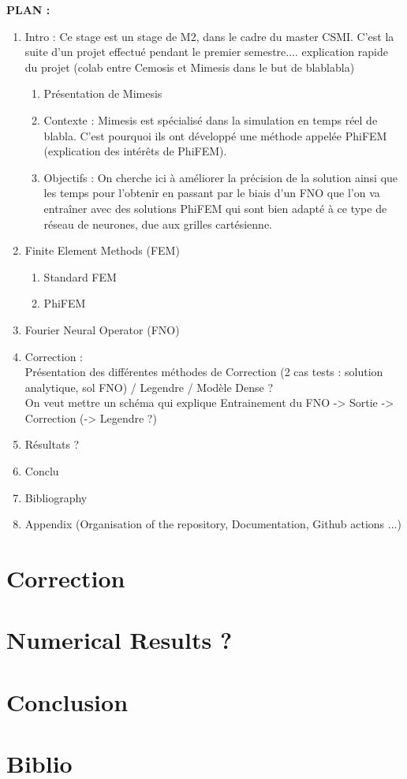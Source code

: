 \documentclass[12pt]{article}
\newcommand{\tmcolor}[2]{{\color{#1}{#2}}}
\newcommand{\modif}[1]{\tmcolor{red}{#1}}
\begin{document}
	\nocite{*}
	
	
	
	\tableofcontents
	
	\newpage
	
	\textbf{PLAN :}
	
	\begin{enumerate}
		\item Intro : Ce stage est un stage de M2, dans le cadre du master CSMI. C'est la suite d'un projet effectué pendant le premier semestre.... explication rapide du projet (colab entre Cemosis et Mimesis dans le but de blablabla)
		\begin{enumerate}
			\item Présentation de Mimesis
			\item Contexte : Mimesis est spécialisé dans la simulation en temps réel de blabla. C'est pourquoi ils ont développé une méthode appelée PhiFEM (explication des intérêts de PhiFEM).
			\item Objectifs : On cherche ici à améliorer la précision de la solution ainsi que les temps pour l'obtenir en passant par le biais d'un FNO que l'on va entraîner avec des solutions PhiFEM qui sont bien adapté à ce type de réseau de neurones, due aux grilles cartésienne.
		\end{enumerate}
		\item Finite Element Methods (FEM)
		\begin{enumerate}
			\item Standard FEM
			\item PhiFEM
		\end{enumerate}
		\item Fourier Neural Operator (FNO)
		\item Correction : \\
		Présentation des différentes méthodes de Correction (2 cas tests : solution analytique, sol FNO) / Legendre / Modèle Dense ?  \\
		On veut mettre un schéma qui explique Entrainement du FNO -> Sortie -> Correction (-> Legendre ?)
		\item Résultats ?
		\item Conclu
		\item Bibliography
		\item Appendix (Organisation of the repository, Documentation, Github actions ...)
	\end{enumerate}

	\newpage
	
	
	\newpage
	
	
	\newpage	
	
	
	\newpage
	\section{Correction}
	\modif{Réfléchir présenter sol considéré et domaines !}
	
	
	\newpage
	\section{Numerical Results ?}
	
	\newpage
	\section{Conclusion}
	
	\newpage
	\section{Biblio}
	
\end{document}
